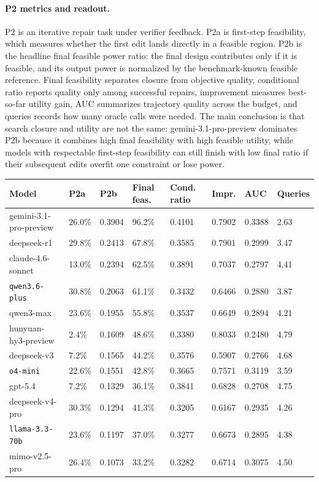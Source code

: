 \paragraph{P2 metrics and readout.}
P2 is an iterative repair task under verifier feedback. P2a is first-step feasibility, which measures whether the first edit lands directly in a feasible region. P2b is the headline final feasible power ratio: the final design contributes only if it is feasible, and its output power is normalized by the benchmark-known feasible reference. Final feasibility separates closure from objective quality, conditional ratio reports quality only among successful repairs, improvement measures best-so-far utility gain, AUC summarizes trajectory quality across the budget, and queries records how many oracle calls were needed. The main conclusion is that search closure and utility are not the same: gemini-3.1-pro-preview dominates P2b because it combines high final feasibility with high feasible utility, while models with respectable first-step feasibility can still finish with low final ratio if their subsequent edits overfit one constraint or lose power.

\begin{center}
\label{tab:appendix_p2_full}
\scriptsize
\setlength{\tabcolsep}{3.5pt}
\renewcommand{\arraystretch}{1.08}
\begin{tabular}{llllllll}
\toprule
Model & P2a & P2b & Final feas. & Cond. ratio & Impr. & AUC & Queries \\
\midrule
gemini-3.1-pro-preview & 26.0\% & 0.3904 & 96.2\% & 0.4101 & 0.7902 & 0.3388 & 2.63 \\
deepseek-r1 & 29.8\% & 0.2413 & 67.8\% & 0.3585 & 0.7901 & 0.2999 & 3.47 \\
claude-4.6-sonnet & 13.0\% & 0.2394 & 62.5\% & 0.3891 & 0.7037 & 0.2797 & 4.41 \\
\texttt{qwen3.6-plus} & 30.8\% & 0.2063 & 61.1\% & 0.3432 & 0.6466 & 0.2880 & 3.87 \\
qwen3-max & 23.6\% & 0.1955 & 55.8\% & 0.3537 & 0.6649 & 0.2894 & 4.21 \\
hunyuan-hy3-preview & 2.4\% & 0.1609 & 48.6\% & 0.3380 & 0.8033 & 0.2480 & 4.79 \\
deepseek-v3 & 7.2\% & 0.1565 & 44.2\% & 0.3576 & 0.5907 & 0.2766 & 4.68 \\
\texttt{o4-mini} & 22.6\% & 0.1551 & 42.8\% & 0.3665 & 0.7571 & 0.3119 & 3.59 \\
gpt-5.4 & 7.2\% & 0.1329 & 36.1\% & 0.3841 & 0.6828 & 0.2708 & 4.75 \\
deepseek-v4-pro & 30.3\% & 0.1294 & 41.3\% & 0.3205 & 0.6167 & 0.2935 & 4.26 \\
\texttt{llama-3.3-70b} & 23.6\% & 0.1197 & 37.0\% & 0.3277 & 0.6673 & 0.2895 & 4.38 \\
mimo-v2.5-pro & 26.4\% & 0.1073 & 33.2\% & 0.3282 & 0.6714 & 0.3075 & 4.50 \\
\bottomrule
\end{tabular}
\end{center}

